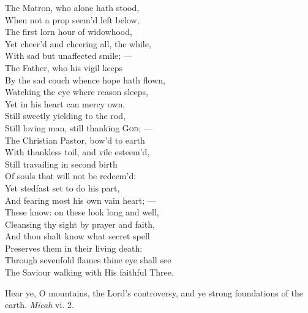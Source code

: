  The Matron, who alone hath stood, \\
 When not a prop seem’d left below, \\
 The first lorn hour of widowhood, \\
 Yet cheer’d and cheering all, the while, \\
 With sad but unaffected smile; — \\
  The Father, who his vigil keeps \\
 By the sad couch whence hope hath flown, \\
 Watching the eye where reason sleeps, \\
 Yet in his heart can mercy own, \\
 Still sweetly yielding to the rod, \\
 Still loving man, still thanking \textsc{God}; — \\
  The Christian Pastor, bow’d to earth \\
 With thankless toil, and vile esteem’d, \\
 Still travailing in second birth \\
 Of souls that will not be redeem’d: \\
 Yet stedfast set to do his part, \\
 And fearing most his own vain heart; — \\
  These know: on these look long and well, \\
 Cleansing thy sight by prayer and faith, \\
 And thou shalt know what secret spell \\
 Preserves them in their living death: \\
 Through sevenfold flames thine eye shall see \\
 The Saviour walking with His faithful Three.\\


Hear ye, O mountains, the Lord’s controversy, and ye strong foundations of the earth. \emph{Micah} vi. 2.

